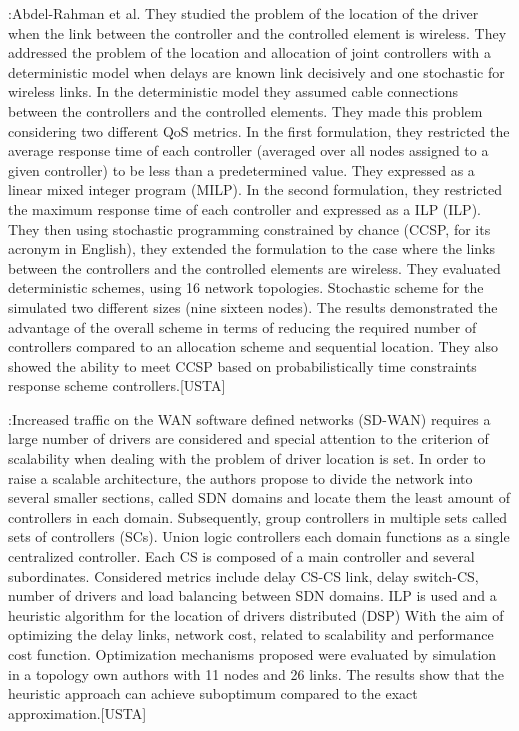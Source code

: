 \documentclass[a4paper,10pt]{article}
\begin{document}
\cite{AbMa17}:Abdel-Rahman et al. They studied the problem of the location of the driver when the link between the controller and the controlled element is wireless. They addressed the problem of the location and allocation of joint controllers with a deterministic model when delays are known link decisively and one stochastic for wireless links.
In the deterministic model they assumed cable connections between the controllers and the controlled elements. They made this problem considering two different QoS metrics. In the first formulation, they restricted the average response time of each controller (averaged over all nodes assigned to a given controller) to be less than a predetermined value. They expressed as a linear mixed integer program (MILP). In the second formulation, they restricted the maximum response time of each controller and expressed as a ILP (ILP). They then using stochastic programming constrained by chance (CCSP, for its acronym in English), they extended the formulation to the case where the links between the controllers and the controlled elements are wireless.
They evaluated deterministic schemes, using 16 network topologies. Stochastic scheme for the simulated two different sizes (nine sixteen nodes). The results demonstrated the advantage of the overall scheme in terms of reducing the required number of controllers compared to an allocation scheme and sequential location. They also showed the ability to meet CCSP based on probabilistically time constraints response scheme controllers.[USTA]


\cite{ZhWu17}:Increased traffic on the WAN software defined networks (SD-WAN) requires a large number of drivers are considered and special attention to the criterion of scalability when dealing with the problem of driver location is set. In order to raise a scalable architecture, the authors propose to divide the network into several smaller sections, called SDN domains and locate them the least amount of controllers in each domain. Subsequently, group controllers in multiple sets called sets of controllers (SCs). Union logic controllers each domain functions as a single centralized controller. Each CS is composed of a main controller and several subordinates.
Considered metrics include delay CS-CS link, delay switch-CS, number of drivers and load balancing between SDN domains. ILP is used and a heuristic algorithm for the location of drivers distributed (DSP) With the aim of optimizing the delay links, network cost, related to scalability and performance cost function. Optimization mechanisms proposed were evaluated by simulation in a topology own authors with 11 nodes and 26 links. The results show that the heuristic approach can achieve suboptimum compared to the exact approximation.[USTA]
\end{document}
